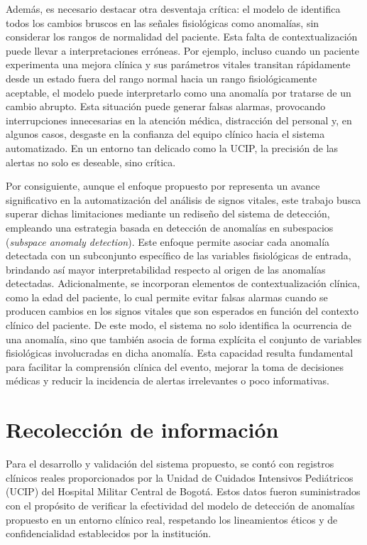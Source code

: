 Además, es necesario destacar otra desventaja crítica: el modelo de \textcite{Vargas2023} identifica todos los cambios bruscos en las señales fisiológicas como anomalías, sin considerar los rangos de normalidad del paciente. Esta falta de contextualización puede llevar a interpretaciones erróneas. Por ejemplo, incluso cuando un paciente experimenta una mejora clínica y sus parámetros vitales transitan rápidamente desde un estado fuera del rango normal hacia un rango fisiológicamente aceptable, el modelo puede interpretarlo como una anomalía por tratarse de un cambio abrupto. Esta situación puede generar falsas alarmas, provocando interrupciones innecesarias en la atención médica, distracción del personal y, en algunos casos, desgaste en la confianza del equipo clínico hacia el sistema automatizado. En un entorno tan delicado como la UCIP, la precisión de las alertas no solo es deseable, sino crítica.

Por consiguiente, aunque el enfoque propuesto por \textcite{Vargas2023} representa un avance significativo en la automatización del análisis de signos vitales, este trabajo busca superar dichas limitaciones mediante un rediseño del sistema de detección, empleando una estrategia basada en detección de anomalías en subespacios (\textit{subspace anomaly detection}). Este enfoque permite asociar cada anomalía detectada con un subconjunto específico de las variables fisiológicas de entrada, brindando así mayor interpretabilidad respecto al origen de las anomalías detectadas. Adicionalmente, se incorporan elementos de contextualización clínica, como la edad del paciente, lo cual permite evitar falsas alarmas cuando se producen cambios en los signos vitales que son esperados en función del contexto clínico del paciente. De este modo, el sistema no solo identifica la ocurrencia de una anomalía, sino que también asocia de forma explícita el conjunto de variables fisiológicas involucradas en dicha anomalía. Esta capacidad resulta fundamental para facilitar la comprensión clínica del evento, mejorar la toma de decisiones médicas y reducir la incidencia de alertas irrelevantes o poco informativas.

\section{Recolección de información}

Para el desarrollo y validación del sistema propuesto, se contó con registros clínicos reales proporcionados por la Unidad de Cuidados Intensivos Pediátricos (UCIP) del Hospital Militar Central de Bogotá. Estos datos fueron suministrados con el propósito de verificar la efectividad del modelo de detección de anomalías propuesto en un entorno clínico real, respetando los lineamientos éticos y de confidencialidad establecidos por la institución.

